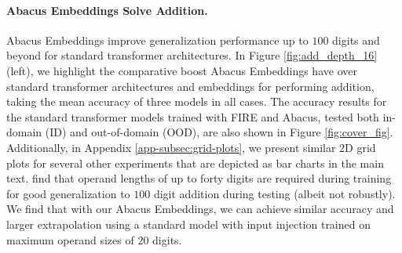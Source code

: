 \documentclass{article}
\begin{document}
\paragraph{Abacus Embeddings Solve Addition.}
Abacus Embeddings improve generalization performance up to $100$ digits and beyond for standard transformer architectures.
In Figure \ref{fig:add_depth_16} (left), we highlight the comparative boost Abacus Embeddings have over standard transformer architectures and embeddings for performing addition, taking the mean accuracy of three models in all cases.
The accuracy results for the standard transformer models trained with FIRE and Abacus, tested both in-domain (ID) and out-of-domain (OOD), are also shown in Figure \ref{fig:cover_fig}. 
Additionally, in Appendix \ref{app-subsec:grid-plots}, we present similar $2$D grid plots for several other experiments that are depicted as bar charts in the main text.
\citet{zhou2024transformers} find that operand lengths of up to forty digits are required during training for good generalization to $100$ digit addition during testing (albeit not robustly).
We find that with our Abacus Embeddings, we can achieve similar accuracy and larger extrapolation using a standard model with input injection trained on maximum operand sizes of \(20\) digits.
\end{document}
